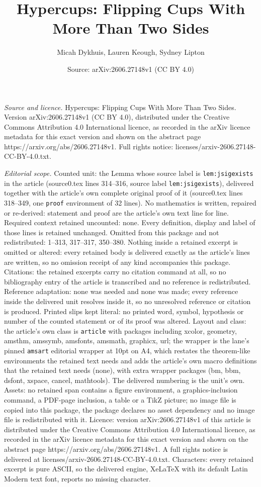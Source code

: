 \documentclass[10pt,a4paper]{amsart}
\title[Hypercups: Flipping Cups With More Than Two Sides]{Hypercups: Flipping Cups With More Than Two Sides}
\author{Micah Dykhuis, Lauren Keough, Sydney Lipton}
\date{Source: arXiv:2606.27148v1 (CC BY 4.0)}
\begin{document}
\maketitle

\noindent\emph{Source and licence.} Hypercups: Flipping Cups With More Than Two Sides. Version arXiv:2606.27148v1 (CC BY 4.0), distributed under the Creative Commons Attribution 4.0 International licence, as recorded in the arXiv licence metadata for this exact version and shown on the abstract page https://arxiv.org/abs/2606.27148v1. Full rights notice: licenses/arxiv-2606.27148-CC-BY-4.0.txt.\par\smallskip

\noindent\textit{Editorial scope.} Counted unit: the Lemma whose source label is \texttt{lem:jsigexists} in the article (source0.tex lines 314--316, source label \texttt{lem:jsigexists}), delivered together with the article's own complete original proof of it (source0.tex lines 318--349, one \texttt{proof} environment of 32 lines). No mathematics is written, repaired or re-derived: statement and proof are the article's own text line for line. Required context retained uncounted: none. Every definition, display and label of those lines is retained unchanged. Omitted from this package and not redistributed: 1--313, 317--317, 350--380. Nothing inside a retained excerpt is omitted or altered: every retained body is delivered exactly as the article's lines are written, so no omission receipt of any kind accompanies this package. Citations: the retained excerpts carry no citation command at all, so no bibliography entry of the article is transcribed and no reference is redistributed. Reference adaptation: none was needed and none was made; every reference inside the delivered unit resolves inside it, so no unresolved reference or citation is produced. Printed slips kept literal: no printed word, symbol, hypothesis or number of the counted statement or of its proof was altered. Layout and class: the article's own class is \texttt{article} with packages including xcolor, geometry, amsthm, amssymb, amsfonts, amsmath, graphicx, url; the wrapper is the lane's pinned \texttt{amsart} editorial wrapper at 10pt on A4, which restates the theorem-like environments the retained text needs and adds the article's own macro definitions that the retained text needs (none), with extra wrapper packages (bm, bbm, dsfont, xspace, cancel, mathtools). The delivered numbering is the unit's own. Assets: no retained span contains a figure environment, a graphics-inclusion command, a PDF-page inclusion, a table or a TikZ picture; no image file is copied into this package, the package declares no asset dependency and no image file is redistributed with it. Licence: version arXiv:2606.27148v1 of this article is distributed under the Creative Commons Attribution 4.0 International licence, as recorded in the arXiv licence metadata for this exact version and shown on the abstract page https://arxiv.org/abs/2606.27148v1. A full rights notice is delivered at licenses/arxiv-2606.27148-CC-BY-4.0.txt. Characters: every retained excerpt is pure ASCII, so the delivered engine, XeLaTeX with its default Latin Modern text font, reports no missing character.
\end{document}
